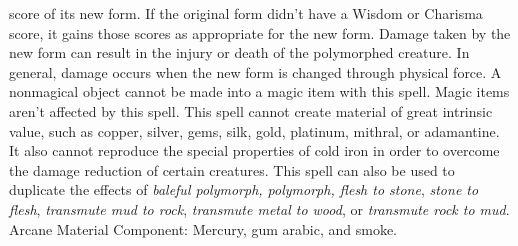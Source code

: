 score of its new form. If the original form didn't have a Wisdom or Charisma score,
it gains those scores as appropriate for the new form.
Damage taken by the new form can result in the injury or death of the polymorphed
creature. In general, damage occurs when the new form is changed through physical
force.
A nonmagical object cannot be made into a magic item with this spell. Magic items
aren't affected by this spell.
This spell cannot create material of great intrinsic value, such as copper, silver,
gems, silk, gold, platinum, mithral, or adamantine. It also cannot reproduce the
special properties of cold iron in order to overcome the damage reduction of certain
creatures.
This spell can also be used to duplicate the effects of \textit{baleful polymorph,
polymorph, flesh to stone}, \textit{stone to flesh}, \textit{transmute mud to rock},
\textit{transmute metal to wood}, or \textit{transmute rock to mud}.
Arcane Material Component: Mercury, gum arabic, and smoke.